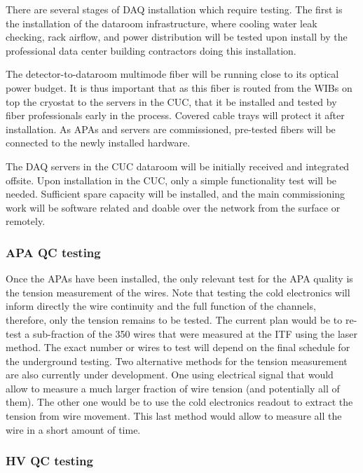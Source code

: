 There are several stages of DAQ installation which require  testing.  The first is the installation of the dataroom infrastructure, where cooling water leak checking, rack airflow, and power distribution will be tested upon install by the professional data center building contractors doing this installation.

The detector-to-dataroom multimode fiber will be running close to its optical power budget.  It is thus important that as this fiber is routed from the WIBs on top the cryostat to the servers in the CUC, that it be installed and tested by fiber professionals early in the process.  Covered cable trays will protect it after installation.  As APAs and servers are commissioned, pre-tested fibers will be connected to the newly installed hardware.

The DAQ servers in the CUC dataroom will be initially received and integrated offsite.  Upon installation in the CUC, only a simple functionality test will be needed.  Sufficient spare capacity will be installed, and the main commissioning work will be software related and doable over the network from the surface or remotely.

\subsubsection{APA QC testing}

Once the APAs have been installed, the only relevant test for the APA quality is the tension measurement of the wires. 
Note that testing the cold electronics will inform directly the wire continuity and the full function of the channels, therefore, only the tension remains to be tested. 
The current plan would be to re-test a sub-fraction of the 350 wires that were measured at the ITF using the laser method. 
The exact number or wires to test will depend on the final schedule for the underground testing. 
Two alternative methods for the tension measurement are also currently under development. 
One using electrical signal that would allow to measure a much larger fraction of wire tension (and potentially all of them). 
The other one would be to use the cold electronics readout to extract the tension from wire movement. 
This last method would allow to measure all the wire in a short amount of time.

\subsubsection{HV QC testing}

